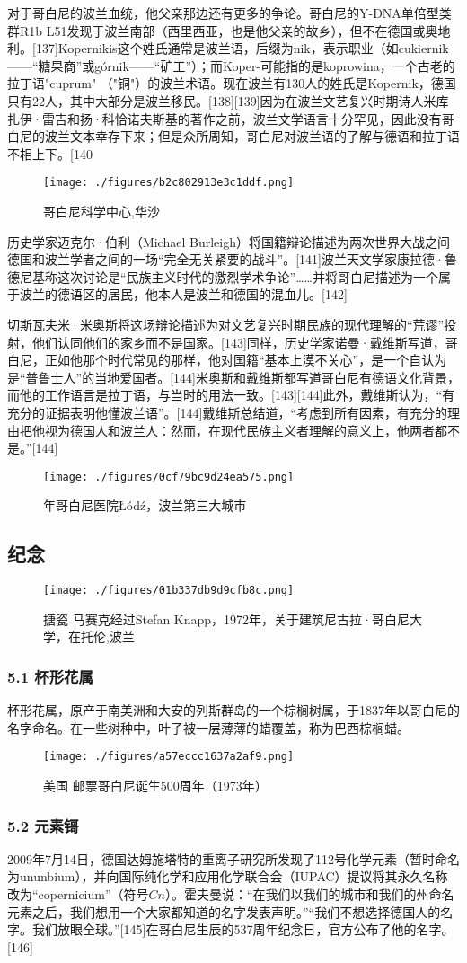 对于哥白尼的波兰血统，他父亲那边还有更多的争论。哥白尼的Y-DNA单倍型类群R1b L51发现于波兰南部（西里西亚，也是他父亲的故乡），但不在德国或奥地利。[137]Kopernikis这个姓氏通常是波兰语，后缀为nik，表示职业（如cukiernik——“糖果商”或górnik——“矿工”）；而Koper-可能指的是koprowina，一个古老的拉丁语"cuprum" （"铜"）的波兰术语。现在波兰有130人的姓氏是Kopernik，德国只有22人，其中大部分是波兰移民。[138][139]因为在波兰文艺复兴时期诗人米库扎伊·雷吉和扬·科恰诺夫斯基的著作之前，波兰文学语言十分罕见，因此没有哥白尼的波兰文本幸存下来；但是众所周知，哥白尼对波兰语的了解与德语和拉丁语不相上下。[140
\begin{figure}[ht]
\centering
\texttt{[image: ./figures/b2c802913e3c1ddf.png]}
\caption{哥白尼科学中心,华沙} \label{fig_GBN_31}
\end{figure}
历史学家迈克尔·伯利（Michael Burleigh）将国籍辩论描述为两次世界大战之间德国和波兰学者之间的一场“完全无关紧要的战斗”。[141]波兰天文学家康拉德·鲁德尼基称这次讨论是“民族主义时代的激烈学术争论”……并将哥白尼描述为一个属于波兰的德语区的居民，他本人是波兰和德国的混血儿。[142]

切斯瓦夫米·米奥斯将这场辩论描述为对文艺复兴时期民族的现代理解的“荒谬”投射，他们认同他们的家乡而不是国家。[143]同样，历史学家诺曼·戴维斯写道，哥白尼，正如他那个时代常见的那样，他对国籍“基本上漠不关心”，是一个自认为是“普鲁士人”的当地爱国者。[144]米奥斯和戴维斯都写道哥白尼有德语文化背景，而他的工作语言是拉丁语，与当时的用法一致。[143][144]此外，戴维斯认为，“有充分的证据表明他懂波兰语”。[144]戴维斯总结道，“考虑到所有因素，有充分的理由把他视为德国人和波兰人：然而，在现代民族主义者理解的意义上，他两者都不是。”[144]
\begin{figure}[ht]
\centering
\texttt{[image: ./figures/0cf79bc9d24ea575.png]}
\caption{年哥白尼医院Łódź，波兰第三大城市} \label{fig_GBN_32}
\end{figure}

\subsection{纪念}
\begin{figure}[ht]
\centering
\texttt{[image: ./figures/01b337db9d9cfb8c.png]}
\caption{搪瓷 马赛克经过Stefan Knapp，1972年，关于建筑尼古拉·哥白尼大学，在托伦,波兰} \label{fig_GBN_34}
\end{figure}

\subsubsection{5.1 杯形花属}
杯形花属，原产于南美洲和大安的列斯群岛的一个棕榈树属，于1837年以哥白尼的名字命名。在一些树种中，叶子被一层薄薄的蜡覆盖，称为巴西棕榈蜡。
\begin{figure}[ht]
\centering
\texttt{[image: ./figures/a57eccc1637a2af9.png]}
\caption{美国 邮票哥白尼诞生500周年（1973年）} \label{fig_GBN_35}
\end{figure}

\subsubsection{5.2 元素鿔}
2009年7月14日，德国达姆施塔特的重离子研究所发现了112号化学元素（暂时命名为ununbium），并向国际纯化学和应用化学联合会（IUPAC）提议将其永久名称改为“copernicium”（符号$Cn$）。霍夫曼说：“在我们以我们的城市和我们的州命名元素之后，我们想用一个大家都知道的名字发表声明。”“我们不想选择德国人的名字。我们放眼全球。”[145]在哥白尼生辰的537周年纪念日，官方公布了他的名字。[146]